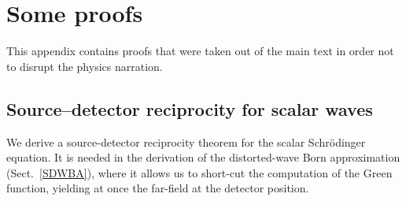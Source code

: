 
\chapter{Some proofs}  \label{sec:Proofs}

This appendix contains proofs that were taken out of the main text
in order not to disrupt the physics narration.

\section{Source--detector reciprocity for scalar waves}
  \label{Sreci1}

We derive a source-detector reciprocity theorem
%
%
for the scalar Schrödinger equation.
It is needed in the derivation of the distorted-wave Born approximation
(Sect.~\ref{SDWBA}),
where it allows us to short-cut the computation of the Green function,
yielding at once the far-field at the detector position.

